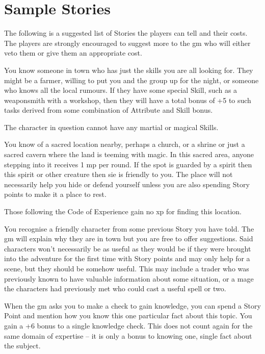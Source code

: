 \section{Sample Stories}

\begin{multicols}{2}

The following is a suggested list of Stories the players can tell and their costs. The players are strongly encouraged to suggest more to the \gls{gm} who will either veto them or give them an appropriate cost.

You know someone in town who has just the skills you are all looking for. They might be a farmer, willing to put you and the group up for the night, or someone who knows all the local rumours. If they have some special Skill, such as a weaponsmith with a workshop, then they will have a total bonus of +5 to such tasks derived from some combination of Attribute and Skill bonus.

The character in question cannot have any martial or magical Skills.

You know of a sacred location nearby, perhaps a church, or a shrine or just a sacred cavern where the land is teeming with magic. In this sacred area, anyone stepping into it receives 1 \gls{mp} per \gls{round}. If the spot is guarded by a spirit then this spirit or other creature then sie is friendly to you. The place will not necessarily help you hide or defend yourself unless you are also spending Story points to make it a place to rest.

Those following the Code of Experience gain no \gls{xp} for finding this location.

You recognise a friendly character from some previous Story you have told. The \gls{gm} will explain why they are in town but you are free to offer suggestions. Said characters won't necessarily be as useful as they would be if they were brought into the adventure for the first time with Story points and may only help for a scene, but they should be somehow useful. This may include a trader who was previously known to have valuable information about some situation, or a mage the characters had previously met who could cast a useful spell or two.

When the \gls{gm} asks you to make a check to gain knowledge, you can spend a Story Point and mention how you know this one particular fact about this topic. You gain a +6 bonus to a single knowledge check. This does not count again for the same domain of expertise -- it is only a bonus to knowing one, single fact about the subject.


\end{multicols}
